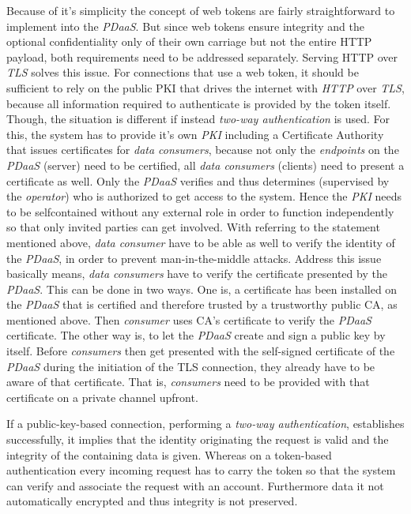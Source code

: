 \documentclass[12pt,english,a4paper,titlepage,cleardoublepage=empty,dottedtoc]{report}
\begin{document}
Because of it's simplicity the concept of web tokens are fairly
straightforward to implement into the \emph{PDaaS}. But since web tokens
ensure integrity and the optional confidentiality only of their own
carriage but not the entire HTTP payload, both requirements need to be
addressed separately. Serving HTTP over \emph{TLS} solves this issue.
For connections that use a web token, it should be sufficient to rely on
the public PKI that drives the internet with \emph{HTTP} over
\emph{TLS}, because all information required to authenticate is provided
by the token itself. Though, the situation is different if instead
\emph{two-way authentication} is used. For this, the system has to
provide it's own \emph{PKI} including a Certificate Authority that
issues certificates for \emph{data consumers}, because not only the
\emph{endpoints} on the \emph{PDaaS} (server) need to be certified, all
\emph{data consumers} (clients) need to present a certificate as well.
Only the \emph{PDaaS} verifies and thus determines (supervised by the
\emph{operator}) who is authorized to get access to the system. Hence
the \emph{PKI} needs to be selfcontained without any external role in
order to function independently so that only invited parties can get
involved. With referring to the statement mentioned above, \emph{data
consumer} have to be able as well to verify the identity of the
\emph{PDaaS}, in order to prevent man-in-the-middle attacks. Address
this issue basically means, \emph{data consumers} have to verify the
certificate presented by the \emph{PDaaS}. This can be done in two ways.
One is, a certificate has been installed on the \emph{PDaaS} that is
certified and therefore trusted by a trustworthy public CA, as mentioned
above. Then \emph{consumer} uses CA's certificate to verify the
\emph{PDaaS} certificate. The other way is, to let the \emph{PDaaS}
create and sign a public key by itself. Before \emph{consumers} then get
presented with the self-signed certificate of the \emph{PDaaS} during
the initiation of the TLS connection, they already have to be aware of
that certificate. That is, \emph{consumers} need to be provided with
that certificate on a private channel upfront.

If a public-key-based connection, performing a \emph{two-way
authentication}, establishes successfully, it implies that the identity
originating the request is valid and the integrity of the containing
data is given. Whereas on a token-based authentication every incoming
request has to carry the token so that the system can verify and
associate the request with an account. Furthermore data it not
automatically encrypted and thus integrity is not preserved.
\end{document}
